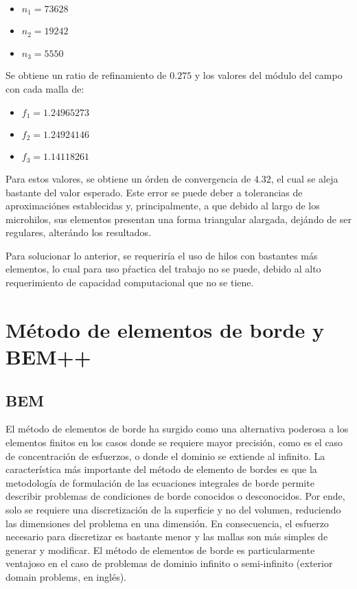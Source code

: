 \documentclass[12pt,letterpaper]{article}
\numberwithin{equation}{section}
\begin{document}
\begin{itemize}
	\item $n_1 = 73628$
	\item $n_2 = 19242$
	\item $n_3 = 5550$
\end{itemize}

Se obtiene un ratio de refinamiento de $0.275$ y los valores del módulo del campo con cada malla de:

\begin{itemize}
	\item $f_1 = 1.24965273$
	\item $f_2 = 1.24924146$
	\item $f_3 = 1.14118261$
\end{itemize}

Para estos valores, se obtiene un órden de convergencia de $4.32$, el cual se aleja bastante del valor esperado. Este error se puede deber a tolerancias de aproximaciónes establecidas y, principalmente, a que debido al largo de los microhilos, sus elementos presentan una forma triangular alargada, dejándo de ser regulares, alterándo los resultados. 

Para solucionar lo anterior, se requeriría el uso de hilos con bastantes más elementos, lo cual para uso pŕactica del trabajo no se puede, debido al alto requerimiento de capacidad computacional que no se tiene.

\section{Método de elementos de borde y BEM++}
\subsection{BEM}

El método de elementos de borde ha surgido como una alternativa poderosa a los elementos finitos en los casos donde se requiere mayor precisión, como es el caso de concentración de esfuerzos, o donde el dominio se extiende al infinito. La característica más importante del método de elemento de bordes es que la metodología de formulación de las ecuaciones integrales de borde permite describir problemas de condiciones de borde conocidos o desconocidos. Por ende, solo se requiere una discretización de la superficie y no del volumen, reduciendo las dimensiones del problema en una dimensión. En consecuencia, el esfuerzo necesario para discretizar es bastante menor y las mallas son más simples de generar y modificar.
El método de elementos de borde es particularmente ventajoso en el caso de problemas de dominio infinito o semi-infinito (exterior domain problems, en inglés).
\end{document}
